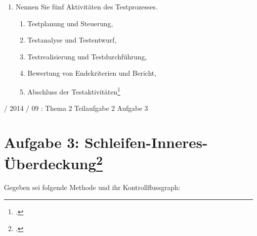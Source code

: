 \documentclass{lehramt-informatik-haupt}
\begin{document}
\begin{enumerate}
\item Nennen Sie fünf Aktivitäten des Testprozesses.

\begin{antwort}
\begin{enumerate}
\item Testplanung und Steuerung,

\item Testanalyse und Testentwurf,

\item Testrealisierung und Testdurchführung,

\item Bewertung von Endekriterien und Bericht,

\item Abschluss der Testaktivitäten\footcite[Kapitel „5.6.2 Der
traditionelle Testprozess“ Seite 135-138]{schatten}
\end{enumerate}
\end{antwort}

\end{enumerate}

%

 / 2014 / 09 : Thema 2 Teilaufgabe 2 Aufgabe 3

%

\section{Aufgabe 3: Schleifen-Inneres-Überdeckung\footcite{sosy:ab:7}}

Gegeben sei folgende Methode und ihr Kontrollflussgraph:

\begin{multicols}{2}

\end{multicols}
\end{document}
